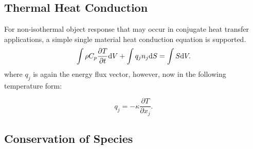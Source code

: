 \subsection{Thermal Heat Conduction}

For non-isothermal object response that may occur in conjugate heat transfer
applications, a simple single material heat conduction equation is supported.
%
\begin{equation}
  \int \rho C_p \frac{\partial T} {\partial t} {\rm d}V
  + \int q_j n_j {\rm d}S = \int S {\rm d}V.
\label{thermalHeatEquation}
\end{equation}
where $q_j$ is again the energy flux vector, however, now in the following 
temperature form:

\begin{equation}
 q_j = -\kappa \frac{\partial T}{\partial x_j}.
\end{equation}

\subsection{Conservation of Species}

